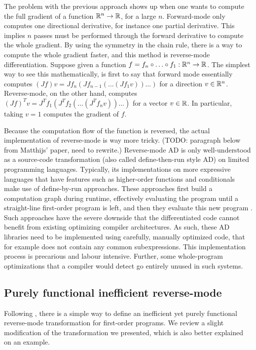 The problem with the previous approach shows up when one wants to compute the full gradient of a function $\mathbb{R}^n\to\mathbb{R}$, for a large $n$. 
Forward-mode only computes one directional derivative, for instance one partial derivative. This implies $n$ passes must be performed through the forward derivative to compute the whole gradient.
By using the symmetry in the chain rule, there is a way to compute the whole gradient faster, and this method is reverse-mode differentiation.
Suppose given a function $f=f_n\circ\ldots\circ f_1 :\mathbb{R}^n\to\mathbb{R}$. 
The simplest way to see this mathematically, is first to say that forward mode essentially computes $(Jf)v=Jf_n(Jf_{n-1}(\ldots(Jf_1v))\ldots)$ for a direction $v\in\mathbb{R}^n$. 
Reverse-mode, on the other hand, computes $(Jf)^Tv =J^Tf_1(J^Tf_{2}(\ldots(J^Tf_nv))\ldots)$ for a vector $v\in\mathbb{R}$.
In particular, taking $v=1$ computes the gradient of $f$.

Because the computation flow of the function is reversed, the actual implementation of reverse-mode is way more tricky. 
(TODO: paragraph below from Matthijs' paper, need to rewrite.)
Reverse-mode AD is only well-understood as a source-code transformation 
(also called define-then-run style AD) on limited programming languages. 
Typically, its implementations on more expressive languages that have features such as higher-order functions and conditionals
make use of define-by-run approaches. 
These approaches first build a computation graph during runtime, effectively evaluating the program until a straight-line
first-order program is left, and then they evaluate this new program \cite{carpenter2015stan,paszke2017automatic}. 
Such approaches have the severe downside that the differentiated code cannot benefit from existing optimizing compiler architectures. 
As such, these AD libraries need to be implemented using carefully, manually optimized code, that for example does not contain any common subexpressions. 
This implementation process is precarious and labour intensive. 
Further, some whole-program optimizations that a compiler would detect go entirely unused in such systems.

\subsection{Purely functional inefficient reverse-mode}

Following \cite{pearlmutter2008reverse}, there is a simple way to define an inefficient yet purely functional reverse-mode transformation for first-order programs.
We review a slight modification of the transformation we presented, which is also better explained on an example. 

